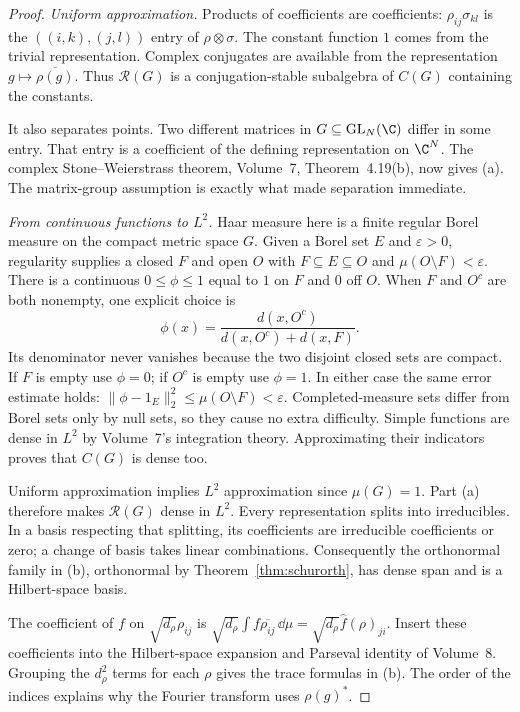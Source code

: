 \begin{proof}
\emph{Uniform approximation.} Products of coefficients are coefficients:
$\rho_{ij}\sigma_{kl}$ is the $((i,k),(j,l))$ entry of $\rho\otimes\sigma$.
The constant function $1$ comes from the trivial representation. Complex conjugates are available from the representation $g\mapsto\overline{\rho(g)}$. Thus $\mathcal R(G)$ is a conjugation-stable subalgebra of $C(G)$ containing the constants.

It also separates points. Two different matrices in $G\subseteq\mathrm{GL}_N(\C)$ differ in some entry. That entry is a coefficient of the defining representation on $\C^N$. The complex Stone--Weierstrass theorem, Volume~7, Theorem~4.19(b), now gives (a). The matrix-group assumption is exactly what made separation immediate.

\emph{From continuous functions to $L^2$.} Haar measure here is a finite regular Borel measure on the compact metric space $G$. Given a Borel set $E$ and $\varepsilon>0$, regularity supplies a closed $F$ and open $O$ with
$F\subseteq E\subseteq O$ and $\mu(O\setminus F)<\varepsilon$.
There is a continuous $0\le\phi\le1$ equal to $1$ on $F$ and $0$ off $O$.
When $F$ and $O^c$ are both nonempty, one explicit choice is
\[
\phi(x)=\frac{d(x,O^c)}{d(x,O^c)+d(x,F)}.
\]
Its denominator never vanishes because the two disjoint closed sets are compact. If $F$ is empty use $\phi=0$; if $O^c$ is empty use $\phi=1$. In either case the same error estimate holds:
$\|\phi-1_E\|_2^2\le\mu(O\setminus F)<\varepsilon$.
Completed-measure sets differ from Borel sets only by null sets, so they cause no extra difficulty. Simple functions are dense in $L^2$ by Volume~7's integration theory. Approximating their indicators proves that $C(G)$ is dense too.

Uniform approximation implies $L^2$ approximation since $\mu(G)=1$. Part (a) therefore makes $\mathcal R(G)$ dense in $L^2$. Every representation splits into irreducibles. In a basis respecting that splitting, its coefficients are irreducible coefficients or zero; a change of basis takes linear combinations. Consequently the orthonormal family in (b), orthonormal by Theorem~\ref{thm:schurorth}, has dense span and is a Hilbert-space basis.

The coefficient of $f$ on $\sqrt{d_\rho}\rho_{ij}$ is
$\sqrt{d_\rho}\int f\overline{\rho_{ij}}\,\dd\mu
=\sqrt{d_\rho}\widehat f(\rho)_{ji}$.
Insert these coefficients into the Hilbert-space expansion and Parseval identity of Volume~8. Grouping the $d_\rho^2$ terms for each $\rho$ gives the trace formulas in (b). The order of the indices explains why the Fourier transform uses $\rho(g)^*$.


\end{proof}
